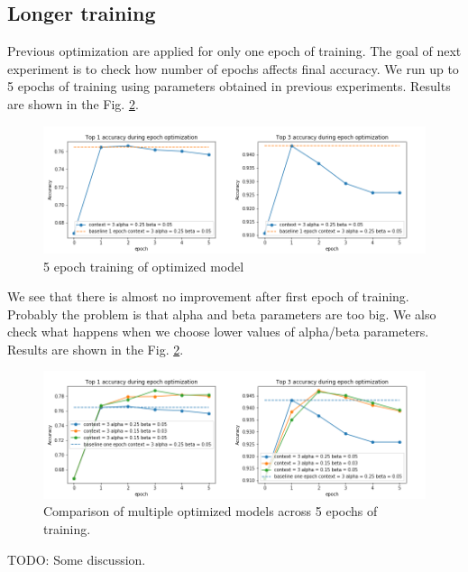 \documentclass{llncs}
\begin{document}
\subsection{Longer training}
Previous optimization are applied for only one epoch of training. The goal of next experiment is to check how number of epochs affects final accuracy. We run up to 5 epochs of training using parameters obtained in previous experiments. Results are shown in the Fig. \ref{fig:exp4_2}.
\begin{figure}
    \label{fig:exp4_1}
    \caption{5 epoch training of optimized model}
    \includegraphics[scale=0.6]{res/exp4_epoch_top_acc.png}
\end{figure}
We see that there is almost no improvement after first epoch of training. Probably the problem is that alpha and beta parameters are too big. We also check what happens when we choose lower values of alpha/beta parameters. Results are shown in the Fig. \ref{fig:exp4_2}.
\begin{figure}
    \label{fig:exp4_2}
    \caption{Comparison of multiple optimized models across 5 epochs of training. }
    \includegraphics[scale=0.6]{res/exp4_epoch_multiconfiguration_top_acc.png}
\end{figure}
TODO: Some discussion.



\end{document}
